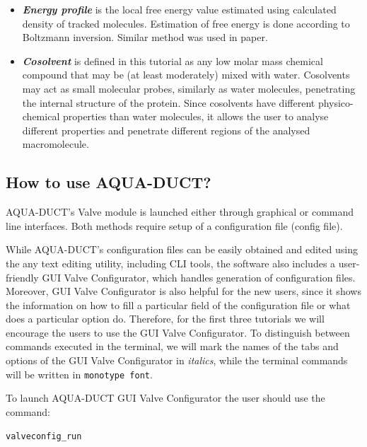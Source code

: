 \documentclass[9pt,tutorial, pubversion]{livecoms}
\begin{document}
\begin{itemize}
\item \textbf{\textit{Energy profile}} is the local free energy value estimated using calculated density of tracked molecules. Estimation of free energy is done according to Boltzmann inversion. Similar method was used in \cite{Rao2017} paper.
\item \textbf{\textit{Cosolvent}} is defined in this tutorial as any low molar mass chemical compound that may be (at least moderately) mixed with water. Cosolvents may act as small molecular probes, similarly as water molecules, penetrating the internal structure of the protein. Since cosolvents have different physico-chemical properties than water molecules, it allows the user to analyse different properties and penetrate different regions of the analysed macromolecule.
\end{itemize}

\subsection{How to use AQUA-DUCT?}

AQUA-DUCT's Valve module is launched either through graphical or command line interfaces. Both methods require setup of a configuration file (config file).

While AQUA-DUCT's configuration files can be easily obtained and edited using the any text editing utility, including CLI tools, the software also includes a user-friendly GUI Valve Configurator, which handles generation of configuration files. Moreover, GUI Valve Configurator is also helpful for the new users, since it shows the information on how to fill a particular field of the configuration file or what does a particular option do. Therefore, for the first three tutorials we will encourage the users to use the GUI Valve Configurator. To distinguish between commands executed in the terminal, we will mark the names of the tabs and options of the GUI Valve Configurator in \textit{italics}, while the terminal commands will be written in \texttt{monotype font}.

To launch AQUA-DUCT GUI Valve Configurator the user should use the command:
\begin{lstlisting}
valveconfig_run
\end{lstlisting}
\end{document}
